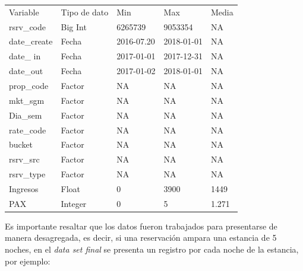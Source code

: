 \begin{table}[H]
\begin{tabular}{lllll}
Variable     & Tipo de dato & Min        & Max        & Media \\
rsrv\_code   & Big Int      & 6265739    & 9053354    & NA    \\
date\_create & Fecha        & 2016-07.20 & 2018-01-01 & NA    \\
date\_ in    & Fecha        & 2017-01-01 & 2017-12-31 & NA    \\
date\_out    & Fecha        & 2017-01-02 & 2018-01-01 & NA    \\
prop\_code   & Factor       & NA         & NA         & NA    \\
mkt\_sgm     & Factor       & NA         & NA         & NA    \\
Dia\_sem     & Factor       & NA         & NA         & NA    \\
rate\_code   & Factor       & NA         & NA         & NA    \\
bucket       & Factor       & NA         & NA         & NA    \\
rsrv\_src    & Factor       & NA         & NA         & NA    \\
rsrv\_type   & Factor       & NA         & NA         & NA    \\
Ingresos     & Float        & 0          & 3900       & 1449  \\
PAX          & Integer      & 0          & 5          & 1.271 \\
\end{tabular}
\end{table}

Es importante resaltar que los datos fueron trabajados para presentarse de manera desagregada, es decir, si una reservación ampara una estancia de 5 noches, en el \emph{data set final} se presenta un registro por cada noche de la estancia, por ejemplo:

